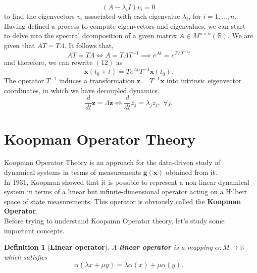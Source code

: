 \documentclass[]{article}
\newtheorem{definition}{Definition}
\begin{document}
\begin{equation}
	(A-\lambda_i I)v_i=0
\end{equation}
to find the eigenvectors $v_i$ associated with each eigenvalue $\lambda_i$, for $i=1,\dots,n$.
Having defined a process to compute eigenvectors and eigenvalues, we can start to delve into the spectral dcomposition of a given matrix $A \in M^{n \times n}(\mathbb{R})$. We are given that $AT=T\Lambda$. It follows that,
\begin{equation}
	AT=T\Lambda \iff A = T\Lambda T^{-1} \implies e^{At} = e^{T\Lambda T^{-1} t} 
\end{equation}
and therefore, we can rewrite $(12)$ as
\begin{equation}
	\textbf{x}(t_0+t) = Te^{At}T^{-1}\textbf{x}(t_0).
\end{equation}
The operator $T^{-1}$ induces a transformation $\textbf{z}=T^{-1}\textbf{x}$ into intrinsic eigenvector coordinates, in which we have decoupled dynamics, 
\begin{equation}
	\frac{d}{dt} \textbf{z} = \Lambda \textbf{z} \iff \frac{d}{dt} z_j=\lambda_j z_j, \,\, \forall j.
\end{equation}

\section{Koopman Operator Theory}
Koopman Operator Theory is an approach for the data-driven study of dynamical systems in terms of measurements $\textbf{g}(\textbf{x})$ obtained from it. \\
In $1931$, Koopman showed that it is possible to represent a non-linear dynamical system in terms of a linear but infinite-dimensional operator acting on a Hilbert space of state measurements. This operator is obviously called the \textbf{Koopman Operator}. \\
Before trying to understand Koopamn Operator theory, let's study some important concepts.
\begin{definition}[\textbf{Linear operator}]
A \textbf{linear operator} is a mapping $\alpha:M \to \mathbb{R}$ which satisfies
\begin{equation}
	\alpha(\lambda x + \mu y) = \lambda \alpha(x) + \mu \alpha(y).
\end{equation}
\end{definition}
\end{document}
